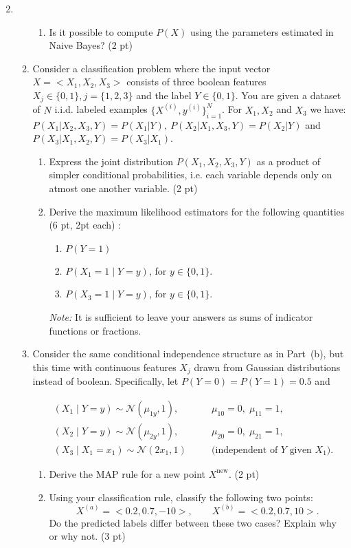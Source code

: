 \documentclass{article}
\theoremstyle{definition}
\theoremstyle{remark}
\newenvironment{Q}
        {%
          \clearpage
          \item
        }
        {%
          \phantom{s} %
          \bigskip
        }
\begin{document}
\begin{enumerate}[font={\Large\bfseries},left=0pt]
\begin{Q}
\begin{enumerate}
\begin{enumerate}
        \item Is it possible to compute $P(X)$ using the parameters estimated in Naive Bayes? (2 pt)
 
\end{enumerate}
\item 
    Consider a classification problem where the input vector \( X = < X_1, X_2, X_3> \) consists of three boolean features \( X_j \in \{0,1\}, j = \{1,2,3\} \) and the label \( Y \in \{0,1\} \). You are given a dataset of \( N \) i.i.d. labeled examples \( \{X^{(i)},y^{(i)}\}_{i=1}^{N} \). For $X_1, X_2$ and $X_3$ we have:
$P(X_1 \vert X_2, X_3,Y) = P(X_1 | Y), ~P(X_2 \vert X_1, X_3, Y) = P(X_2 \vert Y)$ and $P(X_3 \vert X_1, X_2, Y) = P(X_3 \vert X_1)$.

    \begin{enumerate}
        \item   
         Express the joint distribution \( P(X_1, X_2, X_3, Y) \) as a product of simpler conditional probabilities, i.e. each variable depends only on atmost one another variable. (2 pt)

        \item   
        Derive the maximum likelihood estimators for the following quantities (6 pt, 2pt each) :
        \begin{enumerate}
            \item \(  P(Y = 1) \)
            \item \( P(X_1 = 1 \mid Y = y) \), for \( y \in \{0,1\} \).
            \item \(  P(X_3 = 1 \mid Y = y) \), for $y \in \{0,1\}.$
        \end{enumerate}
        
        \textit{Note:}  It is sufficient to leave your answers as sums of indicator functions or fractions.

\end{enumerate}
\item
Consider the same conditional independence structure as in Part~(b), but this time with continuous features $X_j$ drawn from Gaussian distributions instead of boolean. Specifically, let \(P(Y=0)=P(Y=1)=0.5\) and

\[
\begin{aligned}
&(X_1 \mid Y=y) \sim \mathcal N(\mu_{1y},1), \quad &&\mu_{10}=0,\;\mu_{11}=1,\\
&(X_2 \mid Y=y) \sim \mathcal N(\mu_{2y},1), \quad &&\mu_{20}=0,\;\mu_{21}=1,\\
&(X_3 \mid X_1=x_1) \sim \mathcal N(2x_1,1)\quad &&\text{(independent of $Y$ given $X_1$).}
\end{aligned}
\]
\begin{enumerate}
    \item Derive the MAP rule for a new point $X^{\text{new}}$. (2 pt)
\item Using your classification rule, classify the following two points:
\[
X^{(a)} = <0.2, 0.7,-10>, 
\qquad 
X^{(b)} = <0.2, 0.7 ,10>.
\]
Do the predicted labels differ between these two cases? Explain why or why not. (3 pt)
    \end{enumerate}



\end{enumerate}
\end{Q}
\end{enumerate}
\end{document}
